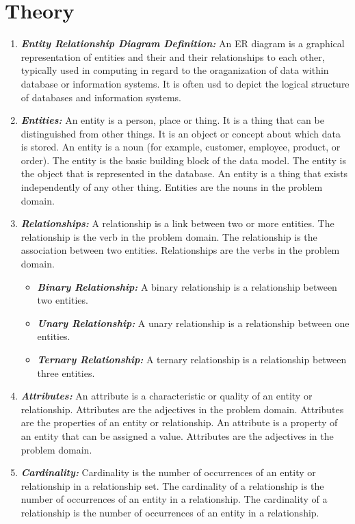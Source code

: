 \documentclass{article}
\begin{document}
\section{\textbf{Theory}}
\begin{enumerate}
	\item \textbf{\textit{Entity Relationship Diagram Definition:}} An ER diagram is a graphical representation of entities and their and their relationships to each other, typically used in computing in regard to the oraganization of data within database or information systems. It is often usd to depict the logical structure of databases and information systems.
	\item \textbf{\textit{Entities:}} An entity is a person, place or thing. It is a thing that can be distinguished from other things. It is an object or concept about which data is stored. An entity is a noun (for example, customer, employee, product, or order). The entity is the basic building block of the data model. The entity is the object that is represented in the database. An entity is a thing that exists independently of any other thing. Entities are the nouns in the problem domain.
	\item \textbf{\textit{Relationships:}} A relationship is a link between two or more entities. The relationship is the verb in the problem domain. The relationship is the association between two entities. Relationships are the verbs in the problem domain.
	\begin{itemize}
		\item \textbf{\textit{Binary Relationship:}} A binary relationship is a relationship between two entities.
		\item \textbf{\textit{Unary Relationship:}} A unary relationship is a relationship between one entities.
		\item \textbf{\textit{Ternary Relationship:}} A ternary relationship is a relationship between three entities.
	\end{itemize}
	\item \textbf{\textit{Attributes:}} An attribute is a characteristic or quality of an entity or relationship. Attributes are the adjectives in the problem domain. Attributes are the properties of an entity or relationship. An attribute is a property of an entity that can be assigned a value. Attributes are the adjectives in the problem domain.
	\item \textbf{\textit{Cardinality:}} Cardinality is the number of occurrences of an entity or relationship in a relationship set. The cardinality of a relationship is the number of occurrences of an entity in a relationship. The cardinality of a relationship is the number of occurrences of an entity in a relationship.

\end{enumerate}
\end{document}
